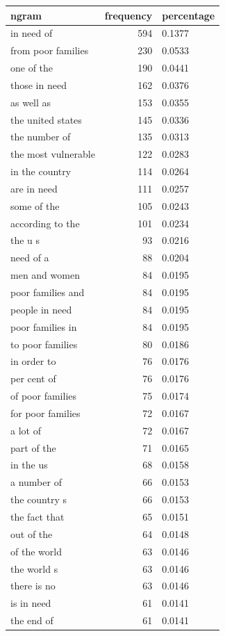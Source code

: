 \begin{tabular}{lrl}
\toprule
ngram & frequency & percentage \\
\midrule
in need of & 594 & 0.1377 \\
from poor families & 230 & 0.0533 \\
one of the & 190 & 0.0441 \\
those in need & 162 & 0.0376 \\
as well as & 153 & 0.0355 \\
the united states & 145 & 0.0336 \\
the number of & 135 & 0.0313 \\
the most vulnerable & 122 & 0.0283 \\
in the country & 114 & 0.0264 \\
are in need & 111 & 0.0257 \\
some of the & 105 & 0.0243 \\
according to the & 101 & 0.0234 \\
the u s & 93 & 0.0216 \\
need of a & 88 & 0.0204 \\
men and women & 84 & 0.0195 \\
poor families and & 84 & 0.0195 \\
people in need & 84 & 0.0195 \\
poor families in & 84 & 0.0195 \\
to poor families & 80 & 0.0186 \\
in order to & 76 & 0.0176 \\
per cent of & 76 & 0.0176 \\
of poor families & 75 & 0.0174 \\
for poor families & 72 & 0.0167 \\
a lot of & 72 & 0.0167 \\
part of the & 71 & 0.0165 \\
in the us & 68 & 0.0158 \\
a number of & 66 & 0.0153 \\
the country s & 66 & 0.0153 \\
the fact that & 65 & 0.0151 \\
out of the & 64 & 0.0148 \\
of the world & 63 & 0.0146 \\
the world s & 63 & 0.0146 \\
there is no & 63 & 0.0146 \\
is in need & 61 & 0.0141 \\
the end of & 61 & 0.0141 \\

\end{tabular}

